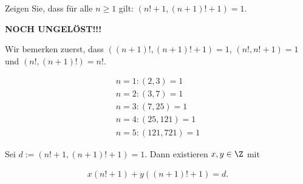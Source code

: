 
\begin{exercise}

Zeigen Sie, dass für alle $n \geq 1$ gilt:
$(n! + 1, (n+1)! + 1) = 1$.

\end{exercise}


\begin{solution}

\textbf{NOCH UNGELÖST!!!}

Wir bemerken zuerst, dass $((n+1)!, (n+1)! + 1) = 1$,
$(n!, n! + 1) = 1$ und $(n!, (n+1)!) = n!$.

\begin{align*}
  n = 1: (2, 3) = 1 \\
  n = 2: (3, 7) = 1 \\
  n = 3: (7, 25) = 1 \\
  n = 4: (25, 121) = 1 \\
  n = 5: (121, 721) = 1
\end{align*}

Sei $d := (n! + 1, (n+1)! + 1) = 1$. Dann existieren $x,y \in \Z$ mit

\begin{align*}
  x(n! + 1) + y((n+1)! + 1) = d.
\end{align*}

\end{solution}

